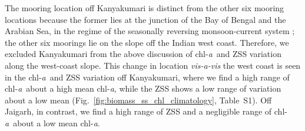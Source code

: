\documentclass[authoryear,review,11pt]{elsarticle}
\newcommand{\chla}{chl-{\emph{a}}}
\begin{document}
The mooring location off Kanyakumari is distinct from the other six mooring locations because the former lies at the junction of the Bay of Bengal and the Arabian Sea, in the regime of the seasonally reversing monsoon-current system \citep{shankar2002monsoon}; the other six moorings lie on the slope off the Indian west coast. Therefore, we excluded Kanyakumari from the above discussion of \chla\ and ZSS variation along the west-coast slope. This change in location \emph{vis-a-vis} the west coast is seen in the \chla\ and ZSS variation off Kanyakumari, where we find a high range of \chla\ about a high mean \chla, while the ZSS shows a low range of variation about a low mean (Fig.~\ref{fig:biomass_ss_chl_climatology}, Table~S1).  Off Jaigarh, in contrast, we find a high range of ZSS and a negligible range of \chla\ about a low mean \chla.
\end{document}
